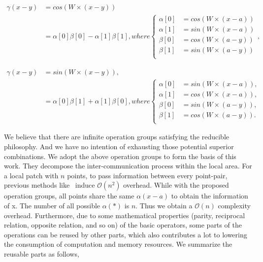 \documentclass[journal]{IEEEtran}
\begin{document}
\begin{small}
\begin{equation}
\begin{aligned}
\gamma(x-y) &=cos(W\times(x-y))\\&=\alpha[0]\beta[0]-\alpha[1]\beta[1]
, where\left\{
\begin{aligned}
\alpha[0] &= cos(W\times(x-a))\\
    \alpha[1] &= sin(W\times(x-a))\\
    \beta[0] &= cos(W\times(a-y))\\
    \beta[1] &= sin(W\times(a-y))\\
\end{aligned}
\right.,
\end{aligned}
\end{equation}
\end{small}

\begin{small}
\begin{equation}
\begin{aligned}
\gamma(x-y) &=sin(W\times(x-y)),\\&=\alpha[0]\beta[1]+\alpha[1]\beta[0]
, where\left\{
\begin{aligned}
\alpha[0] &= sin(W\times(x-a)),\\
    \alpha[1] &= cos(W\times(x-a)),\\
    \beta[0] &= sin(W\times(a-y)),\\
    \beta[1] &= cos(W\times(a-y)).\\
\end{aligned}
\right.
\end{aligned}
\end{equation}
\end{small}

We believe that there are infinite operation groups satisfying the reducible philosophy. And we have no intention of exhausting those potential superior combinations. We adopt the above operation groups to form the basis of this work. They decompose the inter-communication process within the local area. For a local patch with $n$ points, to pass information between every point-pair, previous methods like~\cite{zhao2019pointweb} induce $\mathcal{O}(n^2)$ overhead. While with the proposed operation groups, all points share the same $\alpha(x-a)$ to obtain the information of x. The number of all possible $\alpha(*)$ is $n$. Thus we obtain a $\mathcal{O}(n)$ complexity overhead. Furthermore, due to some mathematical properties (parity, reciprocal relation, opposite relation, and so on) of the basic operators, some parts of the operations can be reused by other parts, which also contributes a lot to lowering the consumption of computation and memory resources. We summarize the reusable parts as follows,
\end{document}
